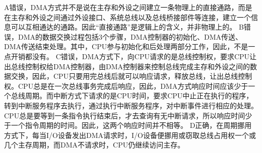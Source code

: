 \begin{solution}A错误，DMA方式并不是说在主存和外设之间建立一条物理上的直接通路，而是在主存和外设之间通过外设接口、系统总线以及总线桥接部件等连接，建立一个信息可以互相通达的通路。因此``直接通路''是逻辑上的含义，并非物理上的。
B错误，DMA的数据交换过程包括3个步骤，DMA控制器的初始化、DMA传送、DMA传送结束处理。其中，CPU参与初始化和后处理两部分工作，因此，不是一点开销都没有。
C错误，DMA方式下，向CPU请求的是总线控制权，要求CPU让出总线控制权给DMA控制器，由DMA控制器来控制总线完成主存和外设之间的数据交换，因此，CPU只要用完总线后就可以响应请求，释放总线，让出总线控制权。CPU总是在一次总线事务完成后响应，因此，DMA方式响应时间应该少于一个总线周期。而中断方式下请求的是CPU时间，要求CPU中止正在执行的程序，转到中断服务程序去执行，通过执行中断服务程序，对中断事件进行相应的处理。CPU总是要等到一条指令执行结束后，才去查询有无中断请求，所以响应时间少于一个指令周期的时间。因此，这两个响应时间并不相等。
D正确，在周期挪用方式下，每当I/O设备发出DMA请求时，I/O设备便挪用或窃取总线占用权一个或几个主存周期，而DMA不请求时，CPU仍继续访问主存。
\end{solution}
